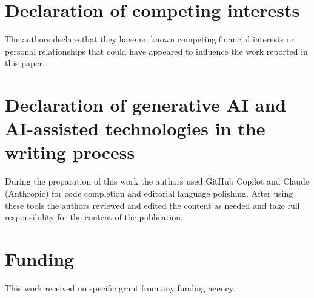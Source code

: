 \documentclass[11pt,a4paper]{article}
\begin{document}
\section*{Declaration of competing interests}
The authors declare that they have no known competing financial
interests or personal relationships that could have appeared to
influence the work reported in this paper.

\section*{Declaration of generative AI and AI-assisted technologies in the writing process}
During the preparation of this work the authors used GitHub Copilot
and Claude (Anthropic) for code completion and editorial language
polishing. After using these tools the authors reviewed and edited
the content as needed and take full responsibility for the content
of the publication.

\section*{Funding}
This work received no specific grant from any funding agency.



\end{document}
